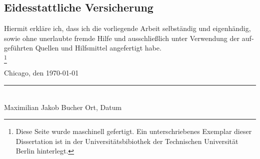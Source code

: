 %
\newcommand\blfootnote[1]{%
	\begingroup
	\renewcommand\thefootnote{}\footnote{#1}
	\addtocounter{footnote}{-1}
	\endgroup
	}
%
%
%
\begin{otherlanguage}{german}
%
\chapter{Eidesstattliche Versicherung}
Hiermit erkläre ich, dass ich die vorliegende Arbeit selbständig und eigenhändig, sowie ohne unerlaubte fremde Hilfe und ausschließlich unter Verwendung der aufgeführten Quellen und Hilfsmittel angefertigt habe.\\

\blfootnote{Diese Seite wurde maschinell gefertigt. Ein unterschriebenes Exemplar dieser Dissertation ist in der Universitätsbibiothek der Technischen Universität Berlin hinterlegt.}
%
\hspace{8cm}Chicago, den \today\\
\hspace{2.5cm}\rule{15cm}{0.4pt}\\
\hspace{2.5cm}Maximilian Jakob Bucher
\hspace{8cm}Ort, Datum\\
%
\end{otherlanguage}